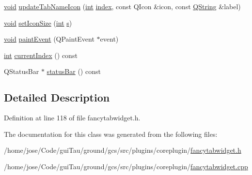 \begin{DoxyCompactItemize}
\item 
\hyperlink{group___u_a_v_objects_plugin_ga444cf2ff3f0ecbe028adce838d373f5c}{void} \hyperlink{group___core_plugin_ga60b5443453a15ccc38967ada38627ea9}{update\-Tab\-Name\-Icon} (\hyperlink{ioapi_8h_a787fa3cf048117ba7123753c1e74fcd6}{int} \hyperlink{glext_8h_ab47dd9958bcadea08866b42bf358e95e}{index}, const Q\-Icon \&icon, const \hyperlink{group___u_a_v_objects_plugin_gab9d252f49c333c94a72f97ce3105a32d}{Q\-String} \&label)
\item 
\hyperlink{group___u_a_v_objects_plugin_ga444cf2ff3f0ecbe028adce838d373f5c}{void} \hyperlink{group___core_plugin_ga7e3a5a0488562dbba9f376378b8ff89f}{set\-Icon\-Size} (\hyperlink{ioapi_8h_a787fa3cf048117ba7123753c1e74fcd6}{int} \hyperlink{glext_8h_ad585a1393cfa368fa9dc3d8ebff640d5}{s})
\item 
\hyperlink{group___u_a_v_objects_plugin_ga444cf2ff3f0ecbe028adce838d373f5c}{void} \hyperlink{group___core_plugin_ga7f3bc1d5a3bdac8f7944f9970d2756eb}{paint\-Event} (Q\-Paint\-Event $\ast$event)
\item 
\hyperlink{ioapi_8h_a787fa3cf048117ba7123753c1e74fcd6}{int} \hyperlink{group___core_plugin_ga472485c9f09c372639cad92656a6d73b}{current\-Index} () const 
\item 
Q\-Status\-Bar $\ast$ \hyperlink{group___core_plugin_ga5581f5fbc90b13a3ddbca61c0dba433c}{status\-Bar} () const 
\end{DoxyCompactItemize}


\subsection{Detailed Description}


Definition at line 118 of file fancytabwidget.\-h.



The documentation for this class was generated from the following files\-:\begin{DoxyCompactItemize}
\item 
/home/jose/\-Code/gui\-Tau/ground/gcs/src/plugins/coreplugin/\hyperlink{coreplugin_2fancytabwidget_8h}{fancytabwidget.\-h}\item 
/home/jose/\-Code/gui\-Tau/ground/gcs/src/plugins/coreplugin/\hyperlink{coreplugin_2fancytabwidget_8cpp}{fancytabwidget.\-cpp}\end{DoxyCompactItemize}

